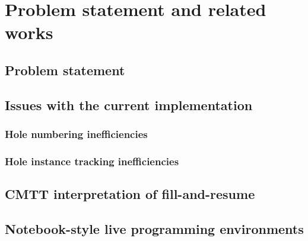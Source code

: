 \section{Problem statement and related works}
\label{sec:prb_stmt_related}

\subsection{Problem statement}
\label{sec:prb_stmt}

\subsection{Issues with the current implementation}
\label{sec:current_problems}

\subsubsection{Hole numbering inefficiencies}
\label{sec:hole_number_inefficiencies}

\subsubsection{Hole instance tracking inefficiencies}
\label{sec:hole_instance_inefficiencies}

\subsection{CMTT interpretation of fill-and-resume}
\label{sec:cmtt}

\subsection{Notebook-style live programming environments}
\label{sec:notebooks}

